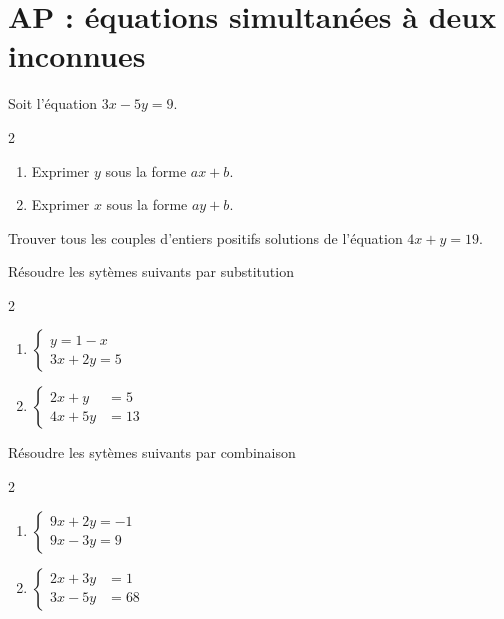 \documentclass[main.tex]{subfiles}
\begin{document}
\section{AP  : équations simultanées à deux inconnues}
\begin{exercise} Soit l'équation $3x-5y=9$.
	\vspace{-1em}
\begin{multicols}{2}
	\begin{enumerate}[leftmargin=*,label=\alph*)]
		\item Exprimer $y$ sous la forme $ax+b$.
		\item Exprimer $x$ sous la forme $ay+b$.
	\end{enumerate}
\end{multicols}
\end{exercise}
\vfill 
\begin{exercise} Trouver tous les couples d'entiers positifs solutions de l'équation $4x+y=19$.
	
	
\end{exercise}
\vfill 
\begin{exercise} Résoudre les sytèmes suivants par substitution
	
\begin{multicols}{2}
	\vspace{-1em}
		\begin{enumerate}[leftmargin =*,label={$S_\arabic*$}] 
		\item $\begin{cases}
		 y=1-x \\3x+2y=5 
		\end{cases}$
		\item $\begin{cases}
			2x + y &= 5 \\4x + 5y &= 13 
		\end{cases}$ 
	\end{enumerate}  
\end{multicols} 
\end{exercise}
\vfill 
\vfill 
\newpage 
\begin{exercise} Résoudre les sytèmes suivants par combinaison
	\vspace{-1em}
	\begin{multicols}{2}
		\begin{enumerate}[leftmargin =*,label={$S_\arabic*$}] 
			\item $\begin{cases}
				9x+2y=-1 \\9x-3y=9 
			\end{cases}$
			\item $\begin{cases}
				2x + 3y &= 1 \\3x-5y &= 68 
			\end{cases}$ 
		\end{enumerate}  
	\end{multicols} 
\end{exercise}
\end{document}
